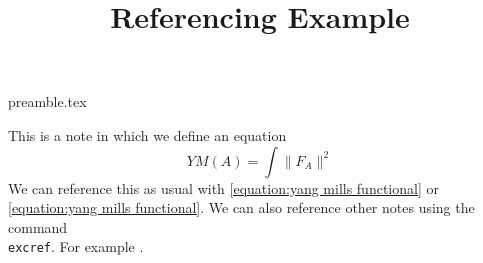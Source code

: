 
\RequirePackage{import}
{preamble.tex}

\title{Referencing Example}


    \maketitle \label{note}
    This is a note in which we define an equation
    \begin{equation} \label{equation:yang mills functional}
        YM(A) = \int \|F_A\|^2
    \end{equation}
    We can reference this as usual with \eqref{equation:yang mills functional} or \cref{equation:yang mills functional}. We can also reference other notes using the command \texttt{\\excref}. For example .

